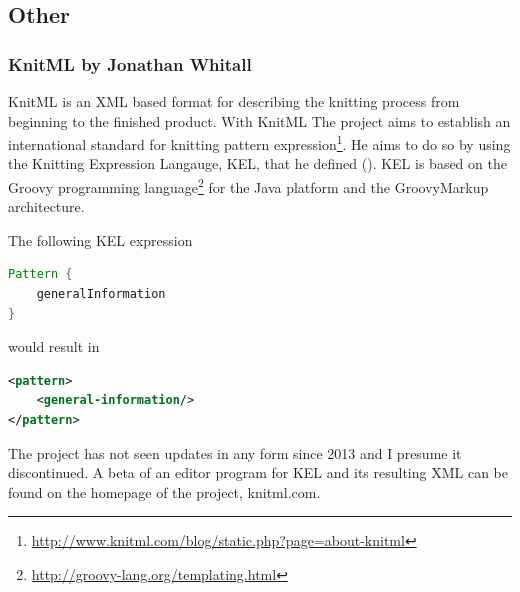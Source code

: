 \subsection{Other}

\subsubsection{KnitML by Jonathan Whitall}
KnitML is an XML based format for describing the knitting process from beginning to the finished product. With KnitML The project aims to establish an international standard for knitting pattern expression\footnote{\url{http://www.knitml.com/blog/static.php?page=about-knitml}}. He aims to do so by using the Knitting Expression Langauge, KEL, that he defined (\cite{knitml}). KEL is based on the Groovy programming language\footnote{\url{http://groovy-lang.org/templating.html}} for the Java platform and the GroovyMarkup architecture.

The following KEL expression

\begin{lstlisting}[language=Java, caption=Example expression in KnitML]
Pattern {
    generalInformation
}
\end{lstlisting}

would result in

\begin{lstlisting}[language=XML, caption=Example expression in KnitM: XML result]
<pattern>
    <general-information/>
</pattern>
\end{lstlisting}

The project has not seen updates in any form since 2013 and I presume it discontinued. A beta of an editor program for KEL and its resulting XML can be found on the homepage of the project, knitml.com.